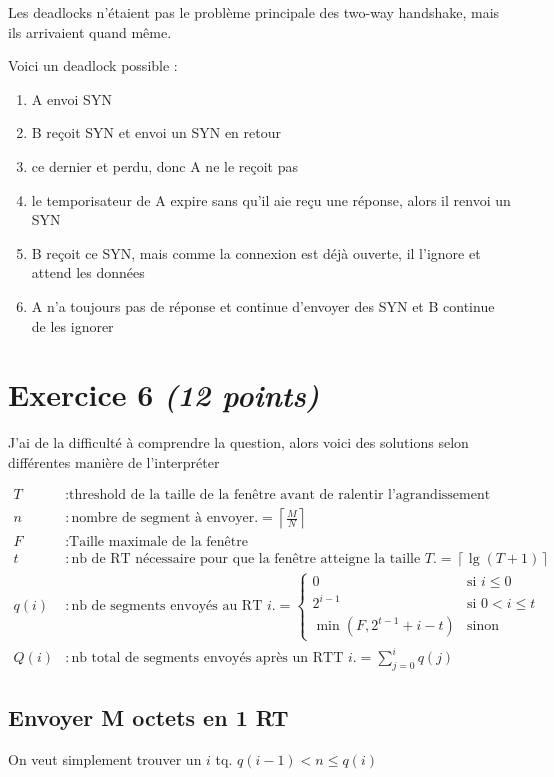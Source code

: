 \documentclass{article}
\begin{document}
Les deadlocks n'étaient pas le problème principale des two-way handshake, mais ils arrivaient quand même.

Voici un deadlock possible :
\begin{enumerate}
    \item A envoi SYN
    \item B reçoit SYN et envoi un SYN en retour
    \item ce dernier et perdu, donc A ne le reçoit pas
    \item le temporisateur de A expire sans qu'il aie reçu une réponse, alors il renvoi un SYN
    \item B reçoit ce SYN, mais comme la connexion est déjà ouverte, il l'ignore et attend les données
    \item A n'a toujours pas de réponse et continue d'envoyer des SYN et B continue de les ignorer
\end{enumerate}


\clearpage

\section{Exercice 6 \emph{(12 points)}}
J'ai de la difficulté à comprendre la question, alors voici des solutions selon différentes manière de l'interpréter

\begin{align*}
    T &: \text{threshold de la taille de la fenêtre avant de ralentir l'agrandissement} \\
    n &: \text{nombre de segment à envoyer.} = \left\lceil \frac{M}{N} \right\rceil \\
    F &: \text{Taille maximale de la fenêtre} \\
    t &: \text{nb de RT nécessaire pour que la fenêtre atteigne la taille $T$.} = \left\lceil\lg(T+1)\right\rceil \\
    q(i) &: \text{nb de segments envoyés au RT $i$.} = 
    \left\{\begin{array}{ll}
         0 & \text{si } i\leq 0 \\
         2^{i-1} & \text{si } 0 < i \leq t \\
         \min(F, 2^{t-1}+i-t) & \text{sinon}
    \end{array}\right.\\
    Q(i) &: \text{nb total de segments envoyés après un RTT $i$.} = \displaystyle\sum_{j=0}^{i} q(j)
\end{align*}

\subsection{Envoyer M octets en 1 RT}
On veut simplement trouver un $i$ tq. $q(i-1) < n \leq q(i)$
\end{document}
